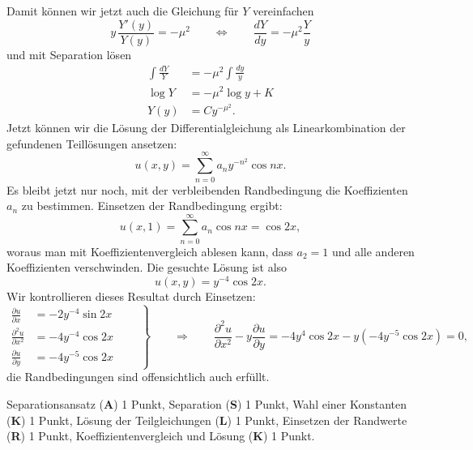 \begin{loesung}
Damit können wir jetzt auch die Gleichung für $Y$ vereinfachen
\[
y\, \frac{Y'(y)}{Y(y)}=-\mu^2
\qquad
\Leftrightarrow
\qquad
\frac{dY}{dy}=-\mu^2\frac{Y}{y}
\]
und mit Separation lösen
\begin{align*}
\int\frac{dY}{Y}&=-\mu^2\int\frac{dy}y\\
\log Y&=-\mu^2\log y+K\\
Y(y)&=Cy^{-\mu^2}.
\end{align*}
Jetzt können wir die Lösung der Differentialgleichung als Linearkombination
der gefundenen Teillösungen ansetzen:
\[
u(x,y)=\sum_{n=0}^\infty a_ny^{-n^2}\cos nx.
\]
Es bleibt jetzt nur noch, mit der verbleibenden Randbedingung die Koeffizienten
$a_n$ zu bestimmen. Einsetzen der Randbedingung ergibt:
\[
u(x,1)=\sum_{n=0}^\infty a_n\cos nx=\cos 2x,
\]
woraus man mit Koeffizientenvergleich ablesen kann,
dass $a_2=1$ und alle anderen Koeffizienten verschwinden.
Die gesuchte Lösung ist also
\[
u(x,y)=y^{-4}\cos 2x.
\]
Wir kontrollieren dieses Resultat durch Einsetzen:
\[
\left.
\begin{aligned}
\frac{\partial u}{\partial x}&=-2y^{-4}\sin 2x
\\
\frac{\partial^2 u}{\partial x^2}&=-4y^{-4}\cos 2x
\\
\frac{\partial u}{\partial y}&=-4y^{-5}\cos 2x
\end{aligned}\qquad
\right\}
\qquad
\Rightarrow
\qquad
\frac{\partial^2u}{\partial x^2}-y\frac{\partial u}{\partial y}=
-4y^4\cos 2x-y(-4y^{-5}\cos 2x)=0,
\]
die Randbedingungen sind offensichtlich auch erfüllt.
\end{loesung}

\begin{bewertung}
Separationsansatz ({\bf A}) 1 Punkt,
Separation  ({\bf S}) 1 Punkt,
Wahl einer Konstanten ({\bf K}) 1 Punkt,
Lösung der Teilgleichungen ({\bf L}) 1 Punkt,
Einsetzen der Randwerte ({\bf R}) 1 Punkt,
Koeffizientenvergleich und Lösung ({\bf K}) 1 Punkt.
\end{bewertung}


